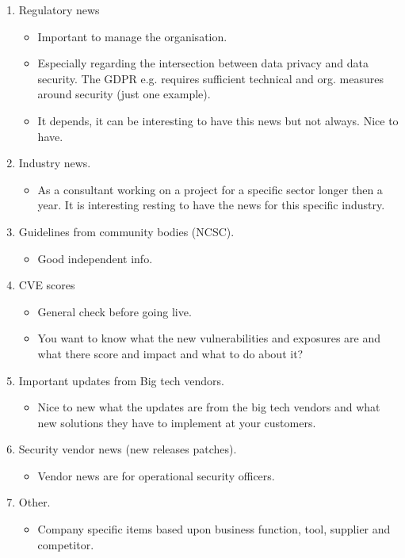 \begin{enumerate}
 \item Regulatory news
  \begin{itemize}
\item Important to manage the organisation.
\item Especially regarding the intersection between data privacy and data security. The GDPR e.g. requires sufficient
technical and org. measures around security (just one example).
\item It depends, it can be interesting to have this news but not always. Nice to have.
 \end{itemize}
 \item Industry news.
  \begin{itemize}
 \item As a consultant working on a project for a specific sector longer then a year. It is interesting resting to have the
news for this specific industry.
 \end{itemize}
 \item Guidelines from community bodies (NCSC).
 \begin{itemize}
 \item Good independent info.
 \end{itemize}
 \item CVE scores
 \begin{itemize}
\item General check before going live.
\item You want to know what the new vulnerabilities and exposures are and what there score and impact and what to
do about it?
\end{itemize}
 \item Important updates from Big tech vendors.
 \begin{itemize}
\item Nice to new what the updates are from the big tech vendors and what new solutions they have to implement at
your customers.
\end{itemize}
 \item Security vendor news (new releases patches).
 \begin{itemize}
\item Vendor news are for operational security  officers.
\end{itemize}
 \item Other.
 \begin{itemize}
\item Company specific items based upon business function, tool, supplier and competitor.
\end{itemize}
\end{enumerate}


